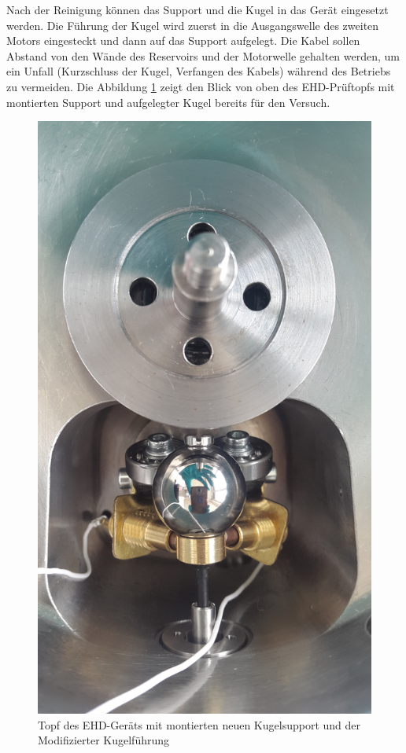 Nach der Reinigung können das Support und die Kugel in das Gerät eingesetzt werden.
Die Führung der Kugel wird zuerst in die Ausgangswelle des zweiten Motors eingesteckt und dann auf das Support aufgelegt.
Die Kabel sollen Abstand von den Wände des Reservoirs und der Motorwelle gehalten werden, um ein Unfall (Kurzschluss der Kugel, Verfangen des Kabels) während des Betriebs zu vermeiden.
Die Abbildung \ref{fig:ehd_topf_mit_kugel_und_support} zeigt den Blick von oben des EHD-Prüftopfs mit montierten Support und aufgelegter Kugel bereits für den Versuch.
\begin{figure}[htb]
    \centering
    \includegraphics[width=0.7\linewidth]{./images/ehd_topf_mit_kugel_und_support.jpg}
    \caption{Topf des EHD-Geräts mit montierten neuen Kugelsupport und der Modifizierter Kugelführung}
    \label{fig:ehd_topf_mit_kugel_und_support}
\end{figure}

